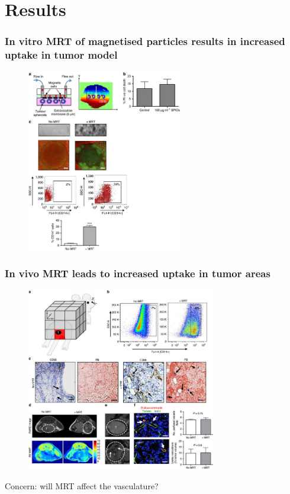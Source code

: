 \documentclass[8pt,xcolor=table]{beamer}
\begin{document}
\section{Results}

\begin{frame}
\frametitle{In vitro MRT of magnetised particles results in increased uptake in tumor model}
 \begin{figure}
 \centering
 \includegraphics[height=8cm]{muthana_invitro_res}
 \end{figure} 
\end{frame}

\begin{frame}
\frametitle{In vivo MRT leads to increased uptake in tumor areas}
 \begin{figure}
 \centering
 \includegraphics[height=8cm]{muthana_fig2_res}
 \end{figure} 
 
 \vfill 
 
 Concern: will MRT affect the vasculature? 
\end{frame}
\end{document}
